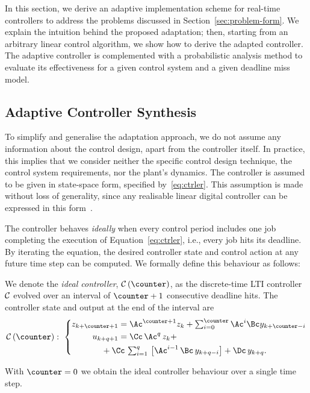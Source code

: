 In this section, we derive an adaptive implementation scheme for real-time controllers to address the problems discussed in Section~\ref{sec:problem-form}.
We explain the intuition behind the proposed adaptation; then, starting from an arbitrary linear control algorithm, we show how to derive the adapted controller.
The adaptive controller is complemented with a probabilistic analysis method to evaluate its effectiveness for a given control system and a given deadline miss model.

\subsection{Adaptive Controller Synthesis}%
\label{sec:adaptation}%
%
To simplify and generalise the adaptation approach, we do not assume any information about the control design, apart from the controller itself. 
In practice, this implies that we consider neither the specific control design technique, the control system requirements, nor the plant's dynamics.
The controller is assumed to be given in state-space form, specified by~\eqref{eq:ctrler}.
This assumption is made without loss of generality, since any realisable linear digital controller can be expressed in this form~\cite{Astrom:2008}.

The controller behaves \emph{ideally} when every control period includes one job completing the execution of Equation~\eqref{eq:ctrler}, i.e., every job hits its deadline.
By iterating the equation, the desired controller state and control action at any future time step can be computed. 
We formally define this behaviour as follows:

\begin{definition}
    We denote the \emph{ideal controller}, $\ctrler\funof{\counter}$, as the discrete-time LTI controller $\mathcal{C}$ evolved over an interval of $\counter+1$ consecutive deadline hits.
    The controller state and output at the end of the interval are
    \begin{equation}
        \label{eq:ctrler-ideal}
        \ctrler\funof{\counter}:\,\, 
        \left\{\begin{aligned}
            z_{k+\counter+1} &= \Ac^{\counter+1} z_{k} + \textstyle\sum_{i=0}^{\counter} \Ac^i \Bc y_{k+\counter-i}\\
            u_{k+q+1} &= \Cc\, \Ac^{q}\, z_k + \\
                       &\hspace{-2em}+ \Cc\, \textstyle\sum\nolimits_{i=1}^{q}\, \left[ \Ac^{i-1}\, \Bc\, y_{k+q-i}\right] 
                       + \Dc\, y_{k+q}.
        \end{aligned}\right.
    \end{equation}
\end{definition}
With $\counter=0$ we obtain the ideal controller behaviour over a single time step.

